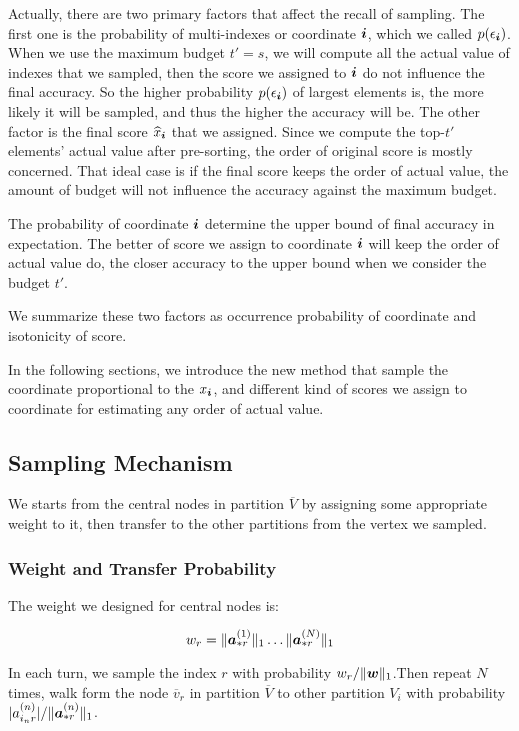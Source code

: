 \documentclass[letterpaper]{article}
\newcommand{\Sca}[3]{{#1}^{(#2)}_{i_#2#3}}%
\newcommand{\V}[1]{{\bm{{\MakeLowercase{#1}}}}}
\newcommand{\Vacol}[1]{\V{a}^{(#1)}_{*r}}
\newcommand{\norm}[2]{\|#1\|_{#2}}
\begin{document}
Actually, there are two primary factors that affect the recall of sampling. The first one is the probability of multi-indexes or coordinate $\V{i}$, which we called $p(\epsilon_{\V{i}})$. When we use the maximum budget $t'=s$, we will compute all the actual value of indexes that we sampled, then the score we assigned to $\V{i}$ do not influence the final accuracy. So the higher probability $p(\epsilon_{\V{i}})$ of largest elements is, the more likely it will be sampled, and thus the higher the accuracy will be. The other factor is the final score $\widehat{x}_{\V{i}}$ that we assigned. Since we compute the top-$t'$ elements' actual value after pre-sorting, the order of original score is mostly concerned. That ideal case is if the final score keeps the order of actual value, the amount of budget will not influence the accuracy against the maximum budget.

The probability of coordinate $\V{i}$ determine the upper bound of final accuracy in expectation. The better of score we assign to coordinate $\V{i}$ will keep the order of actual value do, the closer accuracy to the upper bound when we consider the budget $t'$.

We summarize these two factors as occurrence probability of coordinate and isotonicity of score.

In the following sections, we introduce the new method that sample the coordinate proportional to the $x_{\V{i}}$, and different kind of scores we assign to coordinate for estimating any order of actual value.

\subsection{Sampling Mechanism}

We starts from the central nodes in partition $\overline{V}$ by assigning some appropriate weight to it, then transfer to the other partitions from the vertex we sampled.

\subsubsection{Weight and Transfer Probability}

The weight we designed for central nodes is:

\[
    w_r = \norm{\Vacol{1}}{1}\ldots\norm{\Vacol{N}}{1}
\]

In each turn, we sample the index $r$ with probability $w_r/\norm{\V{w}}{1}$.Then repeat $N$ times, walk form the node $\overline{v}_r$ in partition $\overline{V}$ to other partition $V_i$ with probability $|\Sca{a}{n}{r}|/\norm{\Vacol{n}}{1}$.
\end{document}
